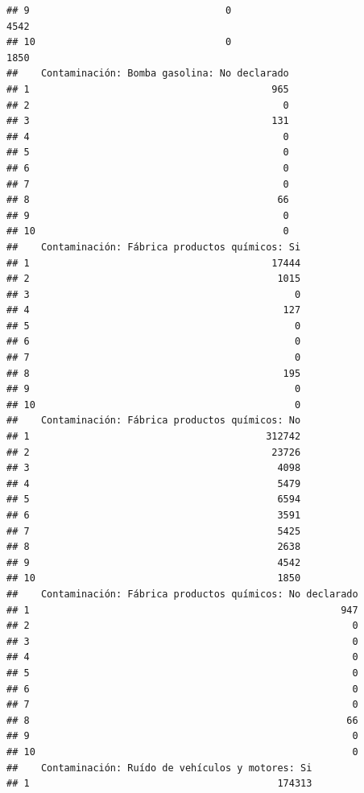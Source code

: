 \documentclass[11pt,]{article}
\begin{document}
\begin{verbatim}
## 9                                  0                              4542
## 10                                 0                              1850
##    Contaminación: Bomba gasolina: No declarado
## 1                                          965
## 2                                            0
## 3                                          131
## 4                                            0
## 5                                            0
## 6                                            0
## 7                                            0
## 8                                           66
## 9                                            0
## 10                                           0
##    Contaminación: Fábrica productos químicos: Si
## 1                                          17444
## 2                                           1015
## 3                                              0
## 4                                            127
## 5                                              0
## 6                                              0
## 7                                              0
## 8                                            195
## 9                                              0
## 10                                             0
##    Contaminación: Fábrica productos químicos: No
## 1                                         312742
## 2                                          23726
## 3                                           4098
## 4                                           5479
## 5                                           6594
## 6                                           3591
## 7                                           5425
## 8                                           2638
## 9                                           4542
## 10                                          1850
##    Contaminación: Fábrica productos químicos: No declarado
## 1                                                      947
## 2                                                        0
## 3                                                        0
## 4                                                        0
## 5                                                        0
## 6                                                        0
## 7                                                        0
## 8                                                       66
## 9                                                        0
## 10                                                       0
##    Contaminación: Ruído de vehículos y motores: Si
## 1                                           174313

\end{verbatim}
\end{document}
